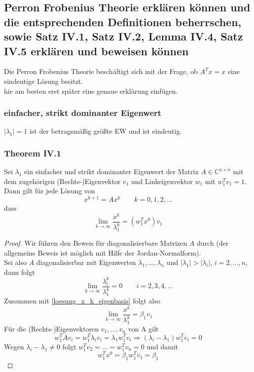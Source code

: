 \documentclass[]{article}
\begin{document}
\subsection*{Perron Frobenius Theorie erklären können und die entsprechenden Definitionen beherrschen, sowie Satz IV.1, Satz IV.2, Lemma IV.4, Satz IV.5 erklären und beweisen können}
Die Perron Frobenius Theorie beschäftigt sich mit der Frage, ob $A^T x = x$ eine eindeutige Lösung besitzt. \\

hie am besten erst später eine genaue erklärung einfügen. \\

\subsubsection*{einfacher, strikt dominanter Eigenwert}
$|\lambda_1|=1$ ist der betragsmäßig größte EW und ist eindeutig.

\subsubsection*{Theorem IV.1}

Sei $\lambda_1$ ein einfacher und strikt dominanter Eigenwert der Matrix $A \in \mathbb{C}^{n \times n}$ mit dem zugehörigen (Rechts-)Eigenvektor $v_1$ und Linkeigenvektor $w_1$ mit $w_1^T v_1 = 1$. Dann gilt für jede Lösung von \[ x^{k+1} = A x^k \qquad k=0,1,2,\dotsc \]
dass
\begin{equation*}
\lim_{k \to \infty} \frac{x^k}{\lambda_1^k} = (w_1^T x^0 ) v_1
\end{equation*}

\begin{proof}
	Wir führen den Beweis für diagonalisierbare Matrizen $A$ durch (der allgemeine Beweis ist möglich mit Hilfe der Jordan-Normalform). \\
	Sei also $A$ diagonalisierbar mit Eigenwerten $\lambda_1, \dotsc, \lambda_n$ und $|\lambda_1| > |\lambda_i|$, $i=2, \dots, n$, dann folgt
	\begin{equation*}
	\lim_{k \to \infty} \frac{\lambda_i^k}{\lambda_1^k} = 0 \qquad i=2,3,4, \dotsc
	\end{equation*}
	Zusammen mit \eqref{loesung_x_k_eigenbasis} folgt also
	\begin{equation*}
	\lim_{k \to \infty} \frac{x^k}{\lambda_1^k} = \beta_1 v_1
	\end{equation*}
	Für die (Rechts-)Eigenvektoren $v_1, \dotsc, v_n$ von A gilt
	\begin{equation*}
	w_1^T A v_i = w_1^T \lambda_i v_i = \lambda_1 w_1^T v_i
	\Rightarrow
	(\lambda_i - \lambda_1) w_1^T v_i = 0
	\end{equation*}
	Wegen $\lambda_i - \lambda_1 \neq 0$ folgt $w_1^T v_2 = \dots = w_1^T v_n = 0$ und damit
	\[ w_1^T x^0 = \beta_1 w_1^T v_1 = \beta_1 \]
\end{proof}
\end{document}
